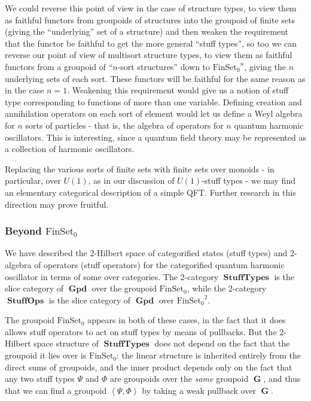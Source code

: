 \documentclass{amsart} \usepackage{amsmath,amssymb,bbm}
\newcommand{\opname}[1]{\operatorname{#1}}
\newcommand{\catname}[1]{\boldsymbol{\opname{{#1}}}}
\newcommand{\FSN}{\catname{FinSet_0}}
\newcommand{\inprod}[1]{\left\langle{#1}\right\rangle}
\begin{document}
We could reverse this point of view in the case of structure types, to
view them as faithful functors from groupoids of structures into the
groupoid of finite sets (giving the ``underlying'' set of a structure)
and then weaken the requirement that the functor be faithful to get
the more general ``stuff types'', so too we can reverse our point of
view of multisort structure types, to view them as faithful functors
from a groupoid of ``$n$-sort structures'' down to $\FSN^n$, giving
the $n$ underlying sets of each sort.  These functors will be faithful
for the same reason as in the case $n = 1$.  Weakening this
requirement would give us a notion of stuff type corresponding to
functions of more than one variable.  Defining creation and
annihilation operators on each sort of element would let us define a
Weyl algebra for $n$ sorts of particles - that is, the algebra of
operators for $n$ quantum harmonic oscillators.  This is interesting,
since a quantum field theory may be represented as a collection of
harmonic oscillators.

Replacing the various sorts of finite sets with finite sets over
monoids - in particular, over $U(1)$, as in our discussion of
$U(1)$-stuff types - we may find an elementary categorical description
of a simple QFT.  Further research in this direction may prove
fruitful.

\subsubsection{Beyond $\FSN$}

We have described the 2-Hilbert space of categorified states (stuff
types) and 2-algebra of operators (stuff operators) for the
categorified quantum harmonic oscillator in terms of some over
categories.  The 2-category $\catname{StuffTypes}$ is the slice
category of $\catname{Gpd}$ over the groupoid $\FSN$, while the
2-category $\catname{StuffOps}$ is the slice category of
$\catname{Gpd}$ over $\FSN^2$.

The groupoid $\FSN$ appears in both of these cases, in the fact that
it does allows stuff operators to act on stuff types by means of
pullbacks.  But the 2-Hilbert space structure of
$\catname{StuffTypes}$ does not depend on the fact that the groupoid
it lies over is $\FSN$: the linear structure is inherited entirely
from the direct sums of groupoids, and the inner product depends only
on the fact that any two stuff types $\Psi$ and $\Phi$ are groupoids
over the \textit{same} groupoid $\catname{G}$, and thus that we can
find a groupoid $\inprod{\Psi,\Phi}$ by taking a weak pullback over
$\catname{G}$.
\end{document}
